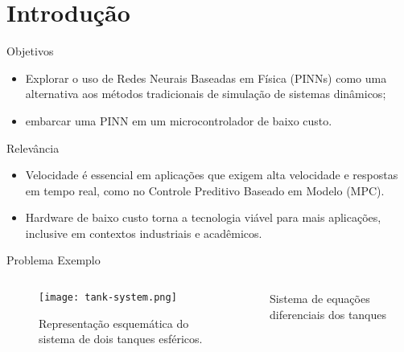 \section{Introdução}

\begin{frame}
  \begin{block}{Objetivos}
    \begin{itemize}
      \item Explorar o uso de Redes Neurais Baseadas em Física (PINNs) como uma alternativa aos métodos tradicionais de simulação de sistemas dinâmicos;
      \item embarcar uma PINN em um microcontrolador de baixo custo.
    \end{itemize}
  \end{block}

  \begin{block}{Relevância}
    \begin{itemize}
      \item Velocidade é essencial em aplicações que exigem alta velocidade e respostas em tempo real, como no Controle Preditivo Baseado em Modelo (MPC).
      \item Hardware de baixo custo torna a tecnologia viável para mais aplicações, inclusive em contextos industriais e acadêmicos.
    \end{itemize}
  \end{block}
\end{frame}

\begin{frame}{Problema Exemplo}
  \begin{columns}
    \begin{column}{0.4\textwidth}
      \begin{figure}
        \centering
        \texttt{[image: tank-system.png]}
        \caption{Representação esquemática do sistema de dois tanques esféricos.}
        \label{fig:tank-system}
      \end{figure}
    \end{column}
    \begin{column}{0.6\textwidth}
      \begin{block}{Sistema de equações diferenciais dos tanques \parencite{wildson_2024}}
        
        \vspace{0cm}
      \end{block}
    \end{column}
  \end{columns}
\end{frame}

